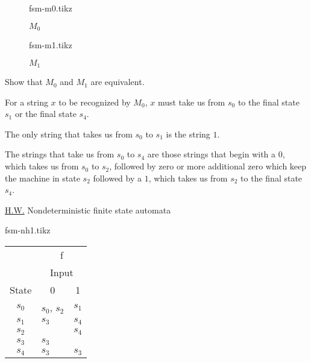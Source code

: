 \documentclass[../main-sheet.tex]{subfiles}
\begin{document}
\begin{figure}[H]
    \centering
    {fsm-m0.tikz}
    \caption{$ M_0 $}
\end{figure}
\begin{figure}[H]
    \centering
    {fsm-m1.tikz}
    \caption{$ M_1 $}
\end{figure}
\begin{prob}
    Show that $ M_0 $ and $ M_1 $ are equivalent.
\end{prob}
\begin{soln}
    For a string $ x $ to be recognized by $ M_0 $, $ x $ must take us from $ s_0 $ to the final state $ s_1 $ or the final state $ s_4 $.

    The only string that takes us from $ s_0 $ to $ s_1 $ is the string $ 1 $.

    The strings that take us from $ s_0 $ to $ s_4 $ are those strings that begin with a $ 0 $, which takes us from $ s_0 $ to $ s_2 $, followed by zero or more additional zero which keep the machine in state $ s_2 $ followed by a $ 1 $, which takes us from $ s_2 $ to the final state $ s_4 $.
\end{soln}
\underline{H.W.} Nondeterministic finite state automata
\begin{table}[H]
    \begin{minipage}[c]{0.58\linewidth}
        \centering
        {fsm-nh1.tikz}
    \end{minipage}
    \begin{minipage}[c]{0.38\linewidth}
        \centering
        \begin{tabular}{@{}cll@{}}
            \toprule
                    & \multicolumn{2}{c}{f}               \\ \cmidrule(l){2-3}
                    & \multicolumn{2}{c}{Input}           \\
            State   &\multicolumn{1}{c}{0} & \multicolumn{1}{c}{1}       \\ \midrule
            $s_0$   & $ s_0 $, $ s_2 $          & $ s_1 $ \\
            $ s_1 $ & $ s_3 $                   & $ s_4 $ \\
            $ s_2 $ &                           & $ s_4 $ \\
            $ s_3 $ & $ s_3 $                   &         \\
            $ s_4 $ & $ s_3 $                   & $ s_3 $ \\ \bottomrule
        \end{tabular}
    \end{minipage}
\end{table}
\end{document}
